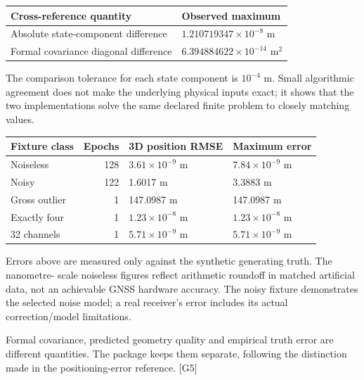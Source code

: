 \documentclass[11pt,a4paper]{article}
\newcommand{\ext}[1]{\textcolor{muted}{[#1]}}
\begin{document}
\begin{center}
\begin{tabularx}{\textwidth}{@{}P{.54\textwidth}Y@{}}\toprule
\textbf{Cross-reference quantity} & \textbf{Observed maximum}\\\midrule
Absolute state-component difference & $1.210719347\times10^{-8}$ m\\
Formal covariance diagonal difference & $6.394884622\times10^{-14}$ m$^2$\\\bottomrule
\end{tabularx}
\end{center}

The comparison tolerance for each state component is $10^{-4}$ m. Small algorithmic
agreement does not make the underlying physical inputs exact; it shows that the two
implementations solve the same declared finite problem to closely matching values.

\begin{center}
\begin{tabularx}{\textwidth}{@{}P{.31\textwidth}rYY@{}}\toprule
\textbf{Fixture class} & \textbf{Epochs} & \textbf{3D position RMSE} & \textbf{Maximum error}\\\midrule
Noiseless &128&$3.61\times10^{-9}$ m&$7.84\times10^{-9}$ m\\
Noisy &122&1.6017 m&3.3883 m\\
Gross outlier &1&147.0987 m&147.0987 m\\
Exactly four &1&$1.23\times10^{-8}$ m&$1.23\times10^{-8}$ m\\
32 channels &1&$5.71\times10^{-9}$ m&$5.71\times10^{-9}$ m\\\bottomrule
\end{tabularx}
\end{center}

Errors above are measured only against the synthetic generating truth. The nanometre-
scale noiseless figures reflect arithmetic roundoff in matched artificial data, not
an achievable GNSS hardware accuracy. The noisy fixture demonstrates the selected
noise model; a real receiver's error includes its actual correction/model limitations.

Formal covariance, predicted geometry quality and empirical truth error are different
quantities. The package keeps them separate, following the distinction made in the
positioning-error reference. \ext{G5}
\clearpage
\end{document}
